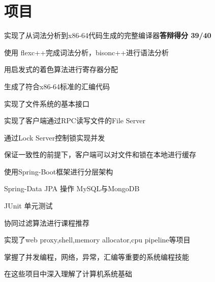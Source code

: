 \documentclass[]{deedy-resume-openfont}
\begin{document}
\begin{minipage}[t]{0.73\textwidth} 


\section{项目}
\sectionsep
\href{https://github.com/Guozhi-explore/Compilers}
\vspace{\topsep}
\begin{tightemize}
    \item 实现了从词法分析到x86-64代码生成的完整编译器\textbf{答辩得分 39/40}
    \item 使用 flexc++完成词法分析，bisonc++进行语法分析
    \item 用启发式的着色算法进行寄存器分配
    \item 生成了符合x86-64标准的汇编代码
\end{tightemize}
\sectionsep
\sectionsep

\begin{tightemize}
\item 实现了文件系统的基本接口
\item 实现了客户端通过RPC读写文件的File Server
\item 通过Lock Server控制锁实现并发
\item 保证一致性的前提下，客户端可以对文件和锁在本地进行缓存
\end{tightemize}
\sectionsep
\sectionsep

\begin{tightemize}
\item 使用Spring-Boot框架进行分层架构
\item Spring-Data JPA 操作 MySQL与MongoDB
\item JUnit 单元测试
\item 协同过滤算法进行课程推荐
\end{tightemize}
\sectionsep
\sectionsep

\begin{tightemize}
\item 实现了web proxy,shell,memory allocator,cpu pipeline等项目
\item 掌握了并发编程，网络，异常，汇编等重要的系统编程技能
\item 在这些项目中深入理解了计算机系统基础
\end{tightemize}
\sectionsep
\sectionsep


\end{minipage}
\end{document}

